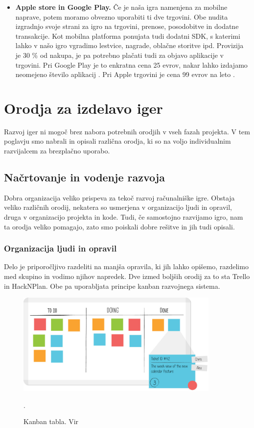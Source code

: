 \documentclass[12pt,a4paper,twoside]{book}
\begin{document}
\begin{itemize}
	\item \textbf{Apple store in Google Play.} Če je naša igra namenjena za mobilne naprave, potem moramo obvezno uporabiti ti dve trgovini. Obe nudita izgradnjo svoje strani za igro na trgovini, prenose, posodobitve in dodatne transakcije. Kot mobilna platforma ponujata tudi dodatni SDK, s katerimi lahko v našo igro vgradimo lestvice, nagrade, oblačne storitve ipd. Provizija je 30 \% od nakupa, je pa potrebno plačati tudi za objavo aplikacije v trgovini. Pri Google Play je to enkratna cena 25 evrov, nakar lahko izdajamo neomejeno število aplikacij \cite{googleplay}. Pri Apple trgovini je cena 99 evrov na leto \cite{applestore}.
\end{itemize} 

\chapter{Orodja za izdelavo iger}\thispagestyle{fancy}
Razvoj iger ni mogoč brez nabora potrebnih orodjih v vseh fazah projekta. V tem poglavju smo nabrali in opisali različna orodja, ki so na voljo individualnim razvijalcem za brezplačno uporabo.
\section{Načrtovanje in vodenje razvoja}
Dobra organizacija veliko prispeva za tekoč razvoj računalniške igre. Obstaja veliko različnih orodij, nekatera so usmerjena v organizacijo ljudi in opravil, druga v organizacijo projekta in kode. Tudi, če samostojno razvijamo igro, nam ta orodja veliko pomagajo, zato smo poiskali dobre rešitve in jih tudi opisali.

\subsection{Organizacija ljudi in opravil}
Delo je priporočljivo razdeliti na manjša opravila, ki jih lahko opišemo, razdelimo med skupino in vodimo njihov napredek. Dve izmed boljših orodij za to sta Trello in HackNPlan. Obe pa uporabljata principe kanban razvojnega sistema.

\begin{figure}[h]
	\centering
	\includegraphics[width=10cm]{kanban_guide_print_KPO_bleed_board2}
	\caption{Kanban tabla. Vir \cite{kanbanBoard}}.
	\label{slika:kanbanBoard}
	\vspace*{-2em}
\end{figure}
\end{document}
